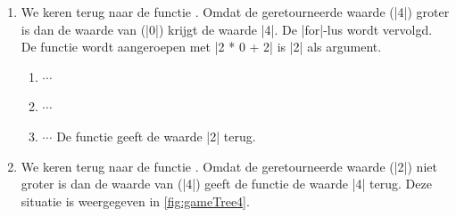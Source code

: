 \begin{cpplstShortInline}
\begin{enumerate}[leftmargin=1.4em]
\begin{enumerate}[label*=\arabic*.,leftmargin=1.4em]
\begin{enumerate}[label*=\arabic*.,leftmargin=1.4em]
\begin{enumerate}[label*=\arabic*.,leftmargin=1.4em]
				\begin{enumerate}[label*=\arabic*.,leftmargin=1.4em]
					\item De functie  geeft de waarde |9| terug.
				\end{enumerate}
				\item Omdat de geretourneerde waarde (|9|) niet kleiner is dan de waarde van  (|8|) geeft de functie  de waarde |8| terug.
			\end{enumerate}
			\item
			We keren terug naar de functie .
			Omdat de geretourneerde waarde (|8|) groter is dan de waarde van  (|6|) geeft de functie  geeft de waarde |8| terug.
		\end{enumerate}
		\item We keren terug naar de functie .
		Omdat de geretourneerde waarde (|8|) niet kleiner is dan de waarde van  (|4|) geeft de functie  de waarde |4| terug.
	\end{enumerate}
	\item We keren terug naar de functie .
	Omdat de geretourneerde waarde (|4|) groter is dan de waarde van  (|0|) krijgt  de waarde |4|.
	De |for|-lus wordt vervolgd.
	De functie  wordt aangeroepen met |2 * 0 + 2| is |2| als argument.
	\begin{enumerate}[label*=\arabic*,leftmargin=1em]
		\item $\cdots$
		\item $\cdots$
		\item $\cdots$ De functie  geeft de waarde |2| terug.
	\end{enumerate}
	\item We keren terug naar de functie .
	Omdat de geretourneerde waarde (|2|) niet groter is dan de waarde van  (|4|) geeft de functie  de waarde |4| terug.
	Deze situatie is weergegeven in \cref{fig:gameTree4}.
	

\end{enumerate}
\end{cpplstShortInline}
